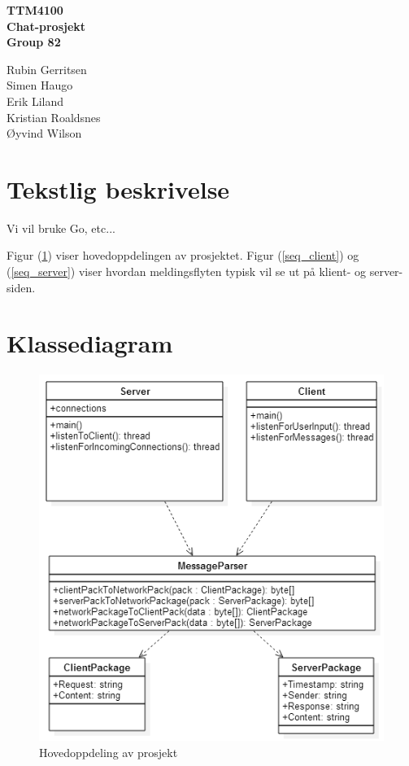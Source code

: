 \documentclass[12pt,a4paper]{article}
\begin{document}
\begin{titlepage}
    \centering
    \vfill
    {\bf\Large
        TTM4100 \\
        Chat-prosjekt \\
        \vskip2cm
        Group 82
    }

    {\large
    Rubin Gerritsen\\
    Simen Haugo\\
    Erik Liland\\
    Kristian Roaldsnes\\
    Øyvind Wilson
    }
    \vfill
    \vfill
    \vfill
\end{titlepage}

\section{Tekstlig beskrivelse}
Vi vil bruke Go, etc...

Figur (\ref{class}) viser hovedoppdelingen av prosjektet.
Figur (\ref{seq_client}) og (\ref{seq_server}) viser hvordan meldingsflyten typisk vil se ut på klient- og server-siden.

\section{Klassediagram}
\begin{figure}[H]
    \centering
    \includegraphics[width=\textwidth]{class_diagram.png}
    \caption{Hovedoppdeling av prosjekt}
    \label{class}
\end{figure}
\end{document}
